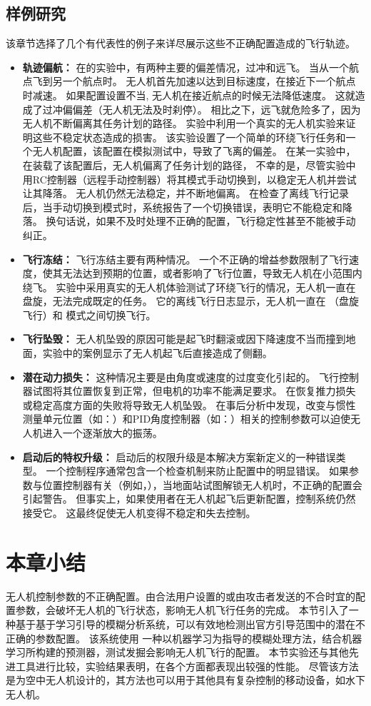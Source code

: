 \subsection{样例研究}
该章节选择了几个有代表性的例子来详尽展示这些不正确配置造成的飞行轨迹。

\begin{itemize}
    \item \textbf{轨迹偏航：} 在的实验中，有两种主要的偏差情况，过冲和远飞。
    当从一个航点飞到另一个航点时。 
    无人机首先加速以达到目标速度，在接近下一个航点时减速。
    如果配置设置不当, 无人机在接近航点的时候无法降低速度。
    这就造成了过冲偏偏差（无人机无法及时刹停）。
    相比之下，远飞就危险多了，因为无人机不断偏离其任务计划的路径。
    实验中利用一个真实的无人机实验来证明这些不稳定状态造成的损害。
    该实验设置了一个简单的环绕飞行任务和一个无人机配置，该配置在模拟测试中，导致了飞离的偏差。
    在某一实验中，在装载了该配置后，无人机偏离了任务计划的路径， 不幸的是，尽管实验中用RC控制器（远程手动控制器）将其模式手动切换到，以稳定无人机并尝试让其降落。
    无人机仍然无法稳定，并不断地偏离。
    在检查了离线飞行记录后，当手动切换到模式时，系统报告了一个切换错误，表明它不能稳定和降落。
    换句话说，如果不及时处理不正确的配置，飞行稳定性甚至不能被手动纠正。
    
    \item \textbf{飞行冻结：}
    飞行冻结主要有两种情况。
    一个不正确的增益参数限制了飞行速度，使其无法达到预期的位置，或者影响了飞行位置，导致无人机在小范围内绕飞。 
    实验中采用真实的无人机体验测试了环绕飞行的情况，无人机一直在盘旋，无法完成既定的任务。
    它的离线飞行日志显示，无人机一直在 （盘旋飞行）和 模式之间切换飞行。
    
    \item \textbf{飞行坠毁：}
    无人机坠毁的原因可能是起飞时翻滚或因下降速度不当而撞到地面，实验中的案例显示了无人机起飞后直接造成了侧翻。

    \item \textbf{潜在动力损失：}
    这种情况主要是由角度或速度的过度变化引起的。
    飞行控制器试图将其位置恢复到正常，但电机的功率不能满足要求。
    在恢复推力损失或稳定高度方面的失败将导致无人机坠毁。
    在事后分析中发现，改变与惯性测量单元位置（如：）和PID角度控制器（如：）相关的控制参数可以迫使无人机进入一个逐渐放大的振荡。
    
    \item \textbf{启动后的特权升级：}
    启动后的权限升级是本解决方案新定义的一种错误类型。
    一个控制程序通常包含一个检查机制来防止配置中的明显错误。
    如果参数与位置控制器有关（例如，），当地面站试图解锁无人机时，不正确的配置会引起警告。
    但事实上，如果使用者在无人机起飞后更新配置，控制系统仍然接受它。
    这最终促使无人机变得不稳定和失去控制。
\end{itemize}


\section{本章小结}
无人机控制参数的不正确配置。由合法用户设置的或由攻击者发送的不合时宜的配置参数，会破坏无人机的飞行状态，影响无人机飞行任务的完成。
本节引入了一种基于基于学习引导的模糊分析系统，可以有效地检测出官方引导范围中的潜在不正确的参数配置。
该系统使用 一种以机器学习为指导的模糊处理方法，结合机器学习所构建的预测器，测试发掘会影响无人机飞行的配置。
本节实验还与其他先进工具进行比较，实验结果表明，\icsearcher 在各个方面都表现出较强的性能。
尽管该方法是为空中无人机设计的，其方法也可以用于其他具有复杂控制的移动设备，如水下无人机。
